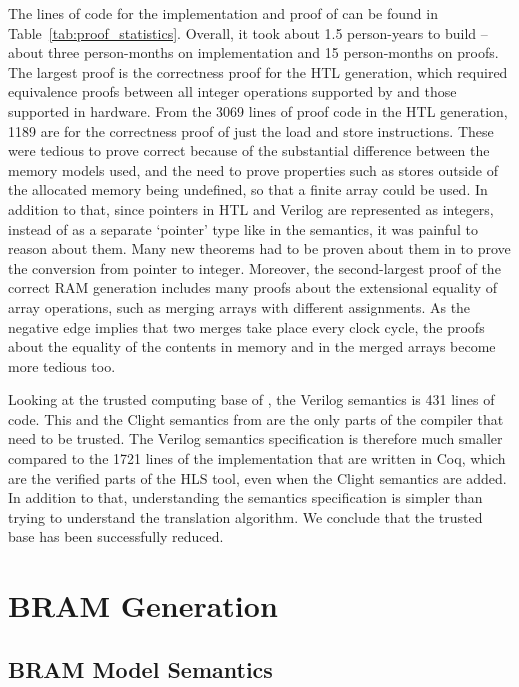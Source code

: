 The lines of code for the implementation and proof of \vericert{} can be found
in Table~\ref{tab:proof_statistics}.  Overall, it took about 1.5 person-years to
build \vericert{} -- about three person-months on implementation and 15
person-months on proofs.  The largest proof is the correctness proof for the HTL
generation, which required equivalence proofs between all integer operations
supported by \compcert{} and those supported in hardware.  From the 3069 lines
of proof code in the HTL generation, 1189 are for the correctness proof of just
the load and store instructions.  These were tedious to prove correct because of
the substantial difference between the memory models used, and the need to prove
properties such as stores outside of the allocated memory being undefined, so
that a finite array could be used. In addition to that, since pointers in HTL
and Verilog are represented as integers, instead of as a separate `pointer' type
like in the \compcert{} semantics, it was painful to reason about them.  Many
new theorems had to be proven about them in \vericert{} to prove the conversion
from pointer to integer.  Moreover, the second-largest proof of the correct RAM
generation includes many proofs about the extensional equality of array
operations, such as merging arrays with different assignments.  As the negative
edge implies that two merges take place every clock cycle, the proofs about the
equality of the contents in memory and in the merged arrays become more tedious
too.

Looking at the trusted computing base of \vericert{}, the Verilog semantics is
431 lines of code.  This and the Clight semantics from \compcert{} are the only
parts of the compiler that need to be trusted.  The Verilog semantics
specification is therefore much smaller compared to the 1721 lines of the
implementation that are written in Coq, which are the verified parts of the HLS
tool, even when the Clight semantics are added.  In addition to that,
understanding the semantics specification is simpler than trying to understand
the translation algorithm. We conclude that the trusted base has been
successfully reduced.

\section{BRAM Generation}%
\label{sec:hg:bram-generation}

\subsection{BRAM Model Semantics}%
\label{sec:hg:bram-model-semantics}

